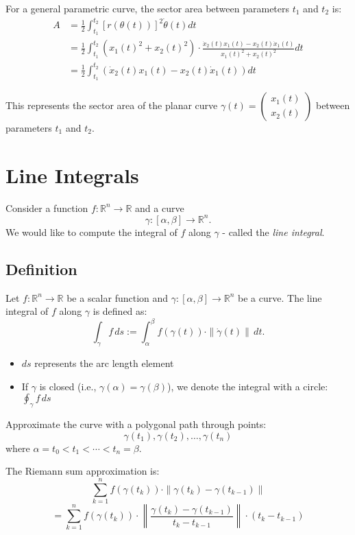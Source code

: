 \documentclass{article}
\begin{document}
For a general parametric curve, the sector area between parameters $t_1$ and $t_2$ is:
\begin{align*}
A &= \frac{1}{2}\int_{t_1}^{t_2} [r(\theta(t))]^2 \dot{\theta}(t) dt \\
&= \frac{1}{2}\int_{t_1}^{t_2} \left(x_1(t)^2 + x_2(t)^2\right) \cdot \frac{\dot{x}_2(t)x_1(t) - x_2(t)\dot{x}_1(t)}{x_1(t)^2 + x_2(t)^2} dt \\
&= \frac{1}{2}\int_{t_1}^{t_2} \left(\dot{x}_2(t)x_1(t) - x_2(t)\dot{x}_1(t)\right) dt
\end{align*}

This represents the sector area of the planar curve $\gamma(t) = \begin{pmatrix} x_1(t) \\ x_2(t) \end{pmatrix}$ between parameters $t_1$ and $t_2$.
\vspace{5mm}
\section{Line Integrals}
Consider a function \( f : \mathbb{R}^n \rightarrow \mathbb{R} \) and a curve
\[ \gamma : [\alpha, \beta] \rightarrow \mathbb{R}^n. \]
We would like to compute the integral of \( f \) along \( \gamma \) - called the \textit{line integral}.

\subsection*{Definition}
Let \( f: \mathbb{R}^n \to \mathbb{R} \) be a scalar function and 
\( \gamma : [\alpha, \beta] \to \mathbb{R}^n \) be a curve. The line integral of \( f \) along \( \gamma \) is defined as:
\[ \int_{\gamma} f \, ds := \int_{\alpha}^{\beta} f(\gamma(t)) \cdot \|\dot{\gamma}(t)\| \, dt. \]

\begin{itemize}
    \item \( ds \) represents the arc length element
    \item If \( \gamma \) is closed (i.e., \( \gamma(\alpha)=\gamma(\beta) \)), we denote the integral with a circle: \( \oint_{\gamma} f \, ds \)
\end{itemize}

Approximate the curve with a polygonal path through points:
\[ \gamma(t_1), \gamma(t_2), \ldots, \gamma(t_n) \]
where \( \alpha = t_0 < t_1 < \cdots < t_n = \beta \).

The Riemann sum approximation is:
\[ \sum_{k=1}^n f(\gamma(t_k)) \cdot \|\gamma(t_k) - \gamma(t_{k-1})\| \]
\[ = \sum_{k=1}^n f(\gamma(t_k)) \cdot \left\|\frac{\gamma(t_k) - \gamma(t_{k-1})}{t_k - t_{k-1}}\right\| \cdot (t_k - t_{k-1}) \]
\end{document}
